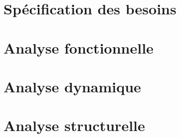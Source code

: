 


\section{Spécification des besoins }

\section{Analyse fonctionnelle }

\section{Analyse dynamique  }

\section{Analyse structurelle   }
